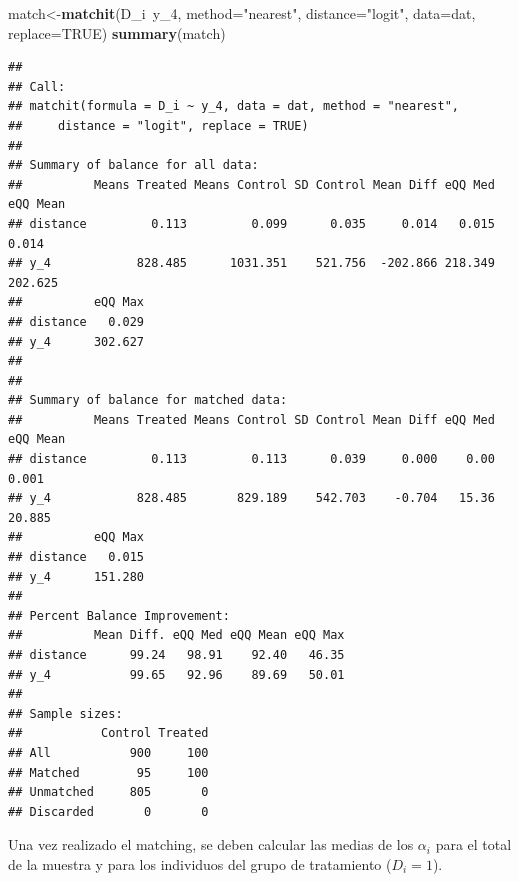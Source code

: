 \documentclass[]{article}
\newenvironment{Shaded}{\begin{snugshade}}{\end{snugshade}}
\newcommand{\KeywordTok}[1]{\textcolor[rgb]{0.13,0.29,0.53}{\textbf{{#1}}}}
\newcommand{\DataTypeTok}[1]{\textcolor[rgb]{0.13,0.29,0.53}{{#1}}}
\newcommand{\DecValTok}[1]{\textcolor[rgb]{0.00,0.00,0.81}{{#1}}}
\newcommand{\StringTok}[1]{\textcolor[rgb]{0.31,0.60,0.02}{{#1}}}
\newcommand{\CommentTok}[1]{\textcolor[rgb]{0.56,0.35,0.01}{\textit{{#1}}}}
\newcommand{\OtherTok}[1]{\textcolor[rgb]{0.56,0.35,0.01}{{#1}}}
\newcommand{\NormalTok}[1]{{#1}}
\begin{document}
\begin{Shaded}
\begin{Highlighting}[]
\NormalTok{match<-}\KeywordTok{matchit}\NormalTok{(D_i~y_4, }\DataTypeTok{method=}\StringTok{"nearest"}\NormalTok{, }\DataTypeTok{distance=}\StringTok{"logit"}\NormalTok{, }\DataTypeTok{data=}\NormalTok{dat, }\DataTypeTok{replace=}\OtherTok{TRUE}\NormalTok{)}
\KeywordTok{summary}\NormalTok{(match)}
\end{Highlighting}
\end{Shaded}

\begin{verbatim}
## 
## Call:
## matchit(formula = D_i ~ y_4, data = dat, method = "nearest", 
##     distance = "logit", replace = TRUE)
## 
## Summary of balance for all data:
##          Means Treated Means Control SD Control Mean Diff eQQ Med eQQ Mean
## distance         0.113         0.099      0.035     0.014   0.015    0.014
## y_4            828.485      1031.351    521.756  -202.866 218.349  202.625
##          eQQ Max
## distance   0.029
## y_4      302.627
## 
## 
## Summary of balance for matched data:
##          Means Treated Means Control SD Control Mean Diff eQQ Med eQQ Mean
## distance         0.113         0.113      0.039     0.000    0.00    0.001
## y_4            828.485       829.189    542.703    -0.704   15.36   20.885
##          eQQ Max
## distance   0.015
## y_4      151.280
## 
## Percent Balance Improvement:
##          Mean Diff. eQQ Med eQQ Mean eQQ Max
## distance      99.24   98.91    92.40   46.35
## y_4           99.65   92.96    89.69   50.01
## 
## Sample sizes:
##           Control Treated
## All           900     100
## Matched        95     100
## Unmatched     805       0
## Discarded       0       0
\end{verbatim}

Una vez realizado el matching, se deben calcular las medias de los
$\alpha_{i}$ para el total de la muestra y para los individuos del grupo
de tratamiento ($D_{i}=1$).

\begin{Shaded}
\end{Shaded}
\end{document}
